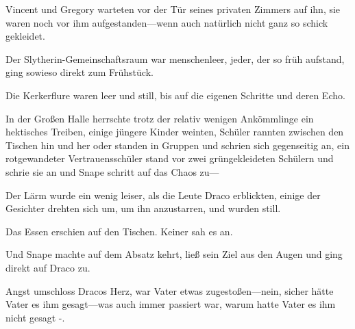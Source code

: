 Vincent und Gregory warteten vor der Tür seines privaten Zimmers auf ihn, sie waren noch vor ihm aufgestanden—wenn auch natürlich nicht ganz so schick gekleidet.

Der Slytherin-Gemeinschaftsraum war menschenleer, jeder, der so früh aufstand, ging sowieso direkt zum Frühstück.

Die Kerkerflure waren leer und still, bis auf die eigenen Schritte und deren Echo.

In der Großen Halle herrschte trotz der relativ wenigen Ankömmlinge ein hektisches Treiben, einige jüngere Kinder weinten, Schüler rannten zwischen den Tischen hin und her oder standen in Gruppen und schrien sich gegenseitig an, ein rotgewandeter Vertrauensschüler stand vor zwei grüngekleideten Schülern und schrie sie an und Snape schritt auf das Chaos zu—

Der Lärm wurde ein wenig leiser, als die Leute Draco erblickten, einige der Gesichter drehten sich um, um ihn anzustarren, und wurden still.

Das Essen erschien auf den Tischen. Keiner sah es an.

Und Snape machte auf dem Absatz kehrt, ließ sein Ziel aus den Augen und ging direkt auf Draco zu.

Angst umschloss Dracos Herz, war Vater etwas zugestoßen—nein, sicher hätte Vater es ihm gesagt—was auch immer passiert war, warum hatte Vater es ihm nicht gesagt -.

